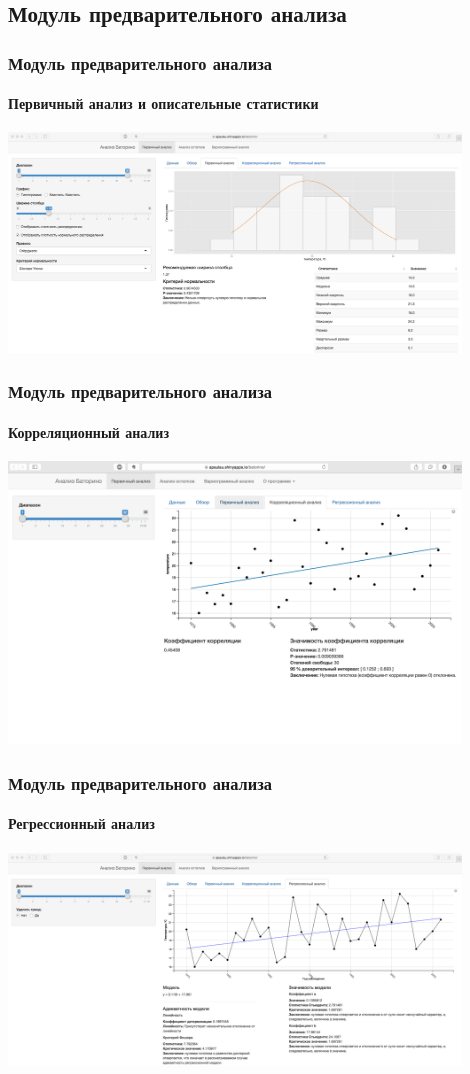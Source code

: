 \documentclass{beamer}
\begin{document}
\subsection{Модуль предварительного анализа}
\begin{frame}
  \frametitle{Модуль предварительного анализа}
  \framesubtitle{Первичный анализ и описательные статистики}
  \begin{center}
    \includegraphics[width=0.9\textwidth]{../../figures/static/1_basis.png}
  \end{center}
\end{frame}

\begin{frame}
  \frametitle{Модуль предварительного анализа}
  \framesubtitle{Корреляционный анализ}
  \begin{center}
    \includegraphics[width=0.9\textwidth]{../../figures/static/p_corr.png}
  \end{center}
\end{frame}

\begin{frame}
  \frametitle{Модуль предварительного анализа}
  \framesubtitle{Регрессионный анализ}
  \begin{center}
    \includegraphics[width=0.9\textwidth]{../../figures/static/2_regr.png}
  \end{center}
\end{frame}
\end{document}
